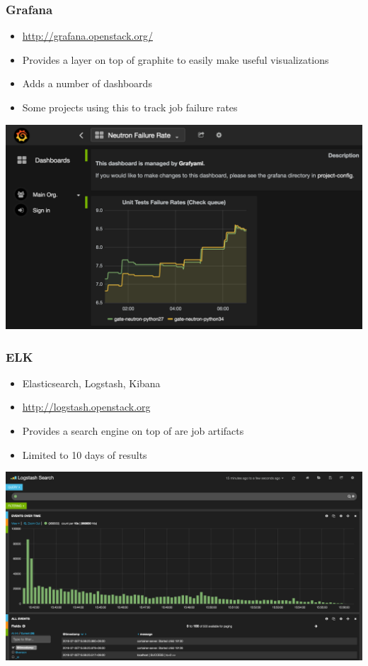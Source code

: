 \documentclass[aspectratio=43,11pt,hyperref={colorlinks=true}]{beamer}
\begin{document}
\begin{frame}
  \frametitle{Grafana}
  \begin{itemize}
    \item \href{http://grafana.openstack.org/}{http://grafana.openstack.org/}
    \item Provides a layer on top of graphite to easily make useful visualizations
    \item Adds a number of dashboards
    \item Some projects using this to track job failure rates
  \end{itemize}
  \begin{center}
    \includegraphics[width=.7\textwidth]{grafana-sample.png}
  \end{center}
\end{frame}

\begin{frame}
  \frametitle{ELK}
  \begin{itemize}
    \item Elasticsearch, Logstash, Kibana
    \item \href{http://logstash.openstack.org}{http://logstash.openstack.org}
    \item Provides a search engine on top of are job artifacts
    \item Limited to 10 days of results
  \end{itemize}
  \begin{center}
    \includegraphics[width=.75\textwidth]{kibana-sample.png}
  \end{center}
\end{frame}
\end{document}
